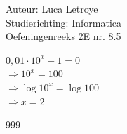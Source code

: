 \documentclass[a4paper]{article}
\begin{document}
  
\noindent \large Auteur: Luca Letroye        \\
\noindent \large Studierichting: Informatica \\
\noindent \large Oefeningenreeks 2E nr. 8.5 \\

\medskip

\normalsize

$0,01\cdot10^x-1=0$\\

$\Rightarrow10^x=100$\\

$\Rightarrow\log 10^x=\log 100$\\

$\Rightarrow x=2$\\

\begin{thebibliography}{999}
\end{thebibliography}
\end{document}
